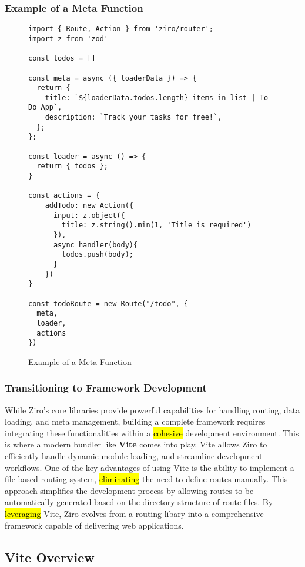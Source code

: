 \pagebreak
\subsubsection*{Example of a Meta Function}
\begin{figure}[h!]
\begin{verbatim}
import { Route, Action } from 'ziro/router';
import z from 'zod'

const todos = []

const meta = async ({ loaderData }) => {
  return {
    title: `${loaderData.todos.length} items in list | To-Do App`,
    description: `Track your tasks for free!`,
  };
};

const loader = async () => {
  return { todos };
}

const actions = {
    addTodo: new Action({
      input: z.object({
        title: z.string().min(1, 'Title is required')
      }),
      async handler(body){
        todos.push(body);
      }
    })
}

const todoRoute = new Route("/todo", {
  meta,
  loader,
  actions
})
\end{verbatim}
\caption{Example of a Meta Function}
\end{figure}

\pagebreak

\subsubsection{Transitioning to Framework Development}

While Ziro's core libraries provide powerful capabilities for handling routing, data loading, and meta management, building a complete framework requires integrating these functionalities within a \hl{cohesive} development environment. This is where a modern bundler like \textbf{Vite} comes into play. Vite allows Ziro to efficiently handle dynamic module loading, and streamline development workflows. One of the key advantages of using Vite is the ability to implement a file-based routing system, \hl{eliminating} the need to define routes manually. This approach simplifies the development process by allowing routes to be automatically generated based on the directory structure of route files. By \hl{leveraging} Vite, Ziro evolves from a routing libary  into a comprehensive framework capable of delivering web applications.


\subsection{Vite Overview}

